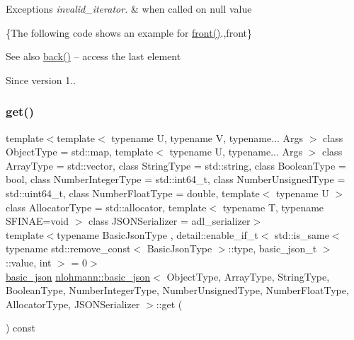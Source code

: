 \begin{DoxyExceptions}{Exceptions}
{\em invalid\+\_\+iterator.} & when called on {\ttfamily null} value\\
\hline
\end{DoxyExceptions}
\{The following code shows an example for {\ttfamily \mbox{\hyperlink{classnlohmann_1_1basic__json_a3acba9c6ceb7214e565fe08c3ba5b352}{front()}}}.,front\}

\begin{DoxySeeAlso}{See also}
\mbox{\hyperlink{classnlohmann_1_1basic__json_a011397134847f36db0ed7d7a93753677}{back()}} -- access the last element
\end{DoxySeeAlso}
\begin{DoxySince}{Since}
version 1.. 
\end{DoxySince}
\mbox{\label{classnlohmann_1_1basic__json_a6b187a22994c12c8cae0dd5ee99dc85e}} 
\subsubsection{\texorpdfstring{get()}{get()}\hspace{0.1cm}{\footnotesize\ttfamily [1/6]}}
{\footnotesize\ttfamily template$<$template$<$ typename U, typename V, typename... Args $>$ class Object\+Type = std\+::map, template$<$ typename U, typename... Args $>$ class Array\+Type = std\+::vector, class String\+Type  = std\+::string, class Boolean\+Type  = bool, class Number\+Integer\+Type  = std\+::int64\+\_\+t, class Number\+Unsigned\+Type  = std\+::uint64\+\_\+t, class Number\+Float\+Type  = double, template$<$ typename U $>$ class Allocator\+Type = std\+::allocator, template$<$ typename T, typename S\+F\+I\+N\+A\+E=void $>$ class J\+S\+O\+N\+Serializer = adl\+\_\+serializer$>$ \\
template$<$typename Basic\+Json\+Type , detail\+::enable\+\_\+if\+\_\+t$<$ std\+::is\+\_\+same$<$ typename std\+::remove\+\_\+const$<$ Basic\+Json\+Type $>$\+::type, basic\+\_\+json\+\_\+t $>$\+::value, int $>$  = 0$>$ \\
\mbox{\hyperlink{classnlohmann_1_1basic__json}{basic\+\_\+json}} \mbox{\hyperlink{classnlohmann_1_1basic__json}{nlohmann\+::basic\+\_\+json}}$<$ Object\+Type, Array\+Type, String\+Type, Boolean\+Type, Number\+Integer\+Type, Number\+Unsigned\+Type, Number\+Float\+Type, Allocator\+Type, J\+S\+O\+N\+Serializer $>$\+::get (\begin{DoxyParamCaption}{ }\end{DoxyParamCaption}) const\hspace{0.3cm}{\ttfamily [inline]}}



